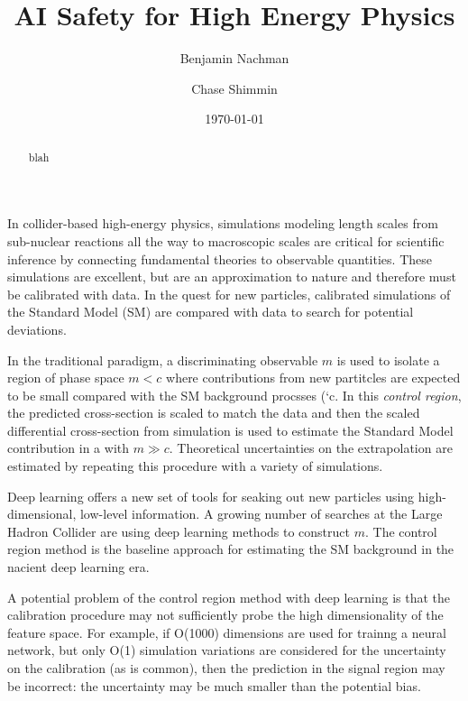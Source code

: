 \documentclass[reprint,nofootinbib,...]{revtex4-1}
\begin{document}
\title{AI Safety for High Energy Physics}

\author{Benjamin Nachman}


\author{Chase Shimmin}


\begin{abstract}
blah
\end{abstract}

\date{\today}
\maketitle


In collider-based high-energy physics, simulations modeling length scales from sub-nuclear reactions all the way to macroscopic scales are critical for scientific inference by connecting fundamental theories to observable quantities.  These simulations are excellent, but are an approximation to nature and therefore must be calibrated with data. In the quest for new particles, calibrated simulations of the Standard Model (SM) are compared with data to search for potential deviations.

In the traditional paradigm, a discriminating observable $m$ is used to isolate a region of phase space $m<c$ where contributions from new partitcles are expected to be small compared with the SM background procsses (`c.  In this \textit{control region}, the predicted cross-section is scaled to match the data and then the scaled differential cross-section from simulation is used to estimate the Standard Model contribution in a  with $m\gg c$.  Theoretical uncertainties on the extrapolation are estimated by repeating this procedure with a variety of simulations.

Deep learning offers a new set of tools for seaking out new particles using high-dimensional, low-level information. A growing number of searches at the Large Hadron Collider are using deep learning methods to construct $m$. The control region method is the baseline approach for estimating the SM background in the nacient deep learning era.

A potential problem of the control region method with deep learning is that the calibration procedure may not sufficiently probe the high dimensionality of the feature space.  For example, if O(1000) dimensions are used for trainng a neural network, but only O(1) simulation variations are considered for the uncertainty on the calibration (as is common), then the prediction in the signal region may be incorrect: the uncertainty may be much smaller than the potential bias.
\end{document}

